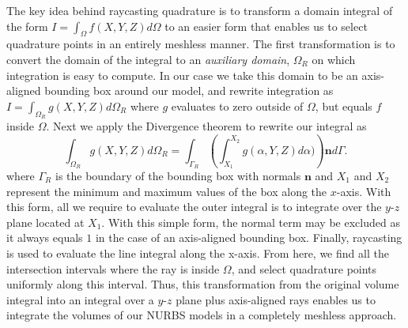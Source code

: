 The key idea behind raycasting quadrature is to transform a domain integral of the form $I=\int_{\Omega} f(X,Y,Z) d\Omega$ to an easier form that enables us to select quadrature points in an entirely meshless manner. The first transformation is to convert the domain of the integral to an \textit{auxiliary domain}, $\Omega_R$ on which integration is easy to compute. In our case we take this domain to be an axis-aligned bounding box around our model, and rewrite integration as $I=\int_{\Omega_R} g(X,Y,Z) d\Omega_R$ where $g$ evaluates to zero outside of $\Omega$, but equals $f$ inside $\Omega$. Next we apply the Divergence theorem to rewrite our integral as
\newcommand{\Zeta}{\mathrm{Z}}
\begin{equation}
\int_{\Omega_R} g(X,Y,Z) d\Omega_R = \int_{\Gamma_R}\left(\int_{X_1}^{X_2} g(\alpha, Y, Z) d\alpha)\right)\mathbf{n} d\Gamma.
\end{equation}
where $\Gamma_R$ is the boundary of the bounding box with normals $\mathbf{n}$ and $X_1$ and $X_2$ represent the minimum and maximum values of the box along the $x$-axis. With this form, all we require to evaluate the outer integral is to integrate over the $y$-$z$ plane located at $X_1$. With this simple form, the normal term may be excluded as it always equals $1$ in the case of an axis-aligned bounding box. Finally, raycasting is used to evaluate the line integral along the x-axis. From here, we find all the intersection intervals where the ray is inside $\Omega$, and select quadrature points uniformly along this interval. Thus, this transformation from the original volume integral into an integral over a $y$-$z$ plane plus axis-aligned rays enables us to integrate the volumes of our NURBS models in a completely meshless approach.

